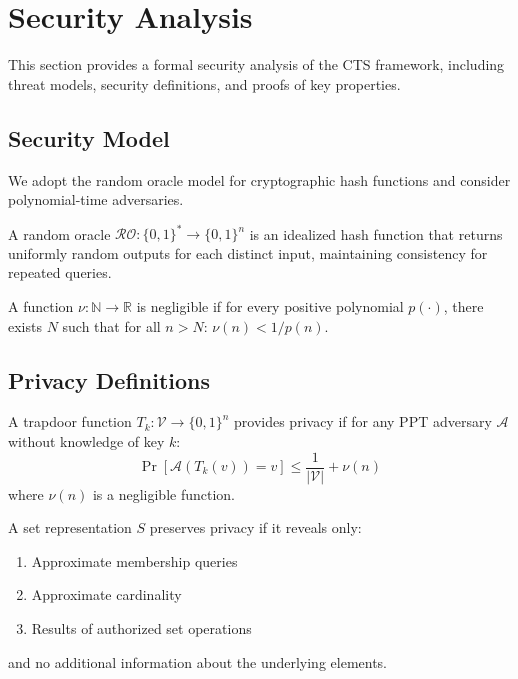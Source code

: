 \documentclass[../main_comprehensive.tex]{subfiles}
\begin{document}
\section{Security Analysis}
\label{sec:security}

This section provides a formal security analysis of the CTS framework, including threat models, security definitions, and proofs of key properties.

\subsection{Security Model}

We adopt the random oracle model for cryptographic hash functions and consider polynomial-time adversaries.

\begin{definition}
A random oracle $\mathcal{RO}: \{0,1\}^* \rightarrow \{0,1\}^n$ is an idealized hash function that returns uniformly random outputs for each distinct input, maintaining consistency for repeated queries.
\end{definition}

\begin{definition}
A function $\nu: \mathbb{N} \rightarrow \mathbb{R}$ is negligible if for every positive polynomial $p(\cdot)$, there exists $N$ such that for all $n > N$: $\nu(n) < 1/p(n)$.
\end{definition}

\subsection{Privacy Definitions}

\begin{definition}
A trapdoor function $T_k: \mathcal{V} \rightarrow \{0,1\}^n$ provides privacy if for any PPT adversary $\mathcal{A}$ without knowledge of key $k$:
$$\Pr[\mathcal{A}(T_k(v)) = v] \leq \frac{1}{|\mathcal{V}|} + \nu(n)$$
where $\nu(n)$ is a negligible function.
\end{definition}

\begin{definition}
A set representation $S$ preserves privacy if it reveals only:
\begin{enumerate}
\item Approximate membership queries
\item Approximate cardinality
\item Results of authorized set operations
\end{enumerate}
and no additional information about the underlying elements.
\end{definition}
\end{document}
